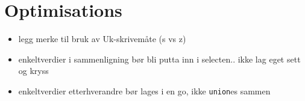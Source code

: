 \section{Optimisations}
\label{sect:discussion:optimisations}
\begin{itemize}
  \item legg merke til bruk av Uk-skrivem\aa te (s vs z)
  \item enkeltverdier i sammenligning b\o r bli putta inn i selecten.. ikke lag
  eget sett og kryss
  \item enkeltverdier etterhverandre b\o r lages i en go, ikke \texttt{union}es
  sammen
\end{itemize}